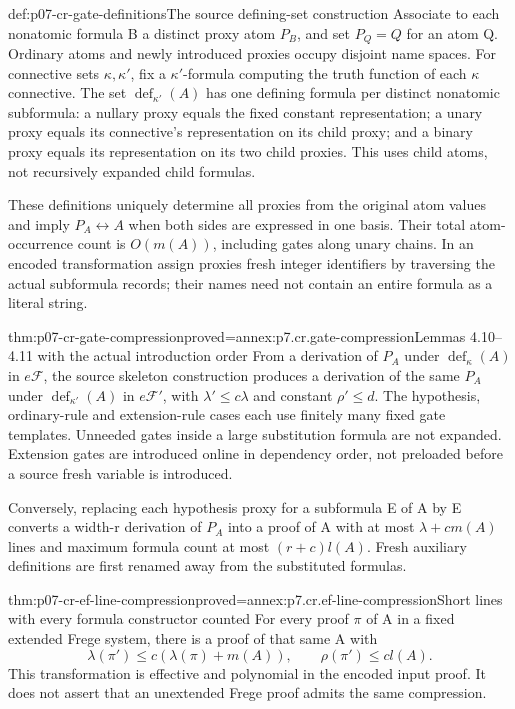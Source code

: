 \begin{hbdefinition}{def:p07-cr-gate-definitions}{The source defining-set construction}
Associate to each nonatomic formula B a distinct proxy atom \(P_B\),
and set \(P_Q=Q\) for an atom Q. Ordinary atoms and newly introduced
proxies occupy disjoint name spaces. For connective sets
\(\kappa,\kappa'\), fix a \(\kappa'\)-formula computing the
truth function of each \(\kappa\) connective. The set
\(\operatorname{def}_{\kappa'}(A)\) has one defining formula
per distinct nonatomic subformula: a nullary proxy equals the fixed
constant representation; a unary proxy equals its connective's
representation on its child proxy; and a binary proxy equals its
representation on its two child proxies. This uses child atoms,
not recursively expanded child formulas.

These definitions uniquely determine all proxies from the original
atom values and imply \(P_A\leftrightarrow A\) when both sides
are expressed in one basis. Their total atom-occurrence count is
\(O(m(A))\), including gates along unary chains. In an encoded
transformation assign proxies fresh
integer identifiers by traversing the actual subformula records;
their names need not contain an entire formula as a literal string.
\end{hbdefinition}

\begin{hbtheorem}{thm:p07-cr-gate-compression}{proved=annex:p7.cr.gate-compression}{Lemmas 4.10--4.11 with the actual introduction order}
From a derivation of \(P_A\) under
\(\operatorname{def}_{\kappa}(A)\) in \(e\mathcal F\), the
source skeleton construction produces a derivation of the same
\(P_A\) under \(\operatorname{def}_{\kappa'}(A)\) in
\(e\mathcal F'\), with \(\lambda'\leq c\lambda\) and
constant \(\rho'\leq d\). The hypothesis, ordinary-rule and
extension-rule cases each use finitely many fixed gate templates.
Unneeded gates inside a large substitution formula are not expanded.
Extension gates are introduced online in dependency order, not
preloaded before a source fresh variable is introduced.

Conversely, replacing each hypothesis proxy for a subformula E of
A by E converts a width-r derivation of \(P_A\) into a proof of
A with at most \(\lambda+c m(A)\) lines and maximum formula
count at most \((r+c)l(A)\). Fresh auxiliary definitions are first
renamed away from the substituted formulas.
\end{hbtheorem}

\begin{hbtheorem}{thm:p07-cr-ef-line-compression}{proved=annex:p7.cr.ef-line-compression}{Short lines with every formula constructor counted}
For every proof \(\pi\) of A in a fixed extended Frege system,
there is a proof of that same A with
\[
 \lambda(\pi')\leq c(\lambda(\pi)+m(A)),\qquad
 \rho(\pi')\leq c l(A).
\]
This transformation is effective and polynomial in the encoded input
proof. It does not assert that an unextended Frege proof admits the
same compression.
\end{hbtheorem}

